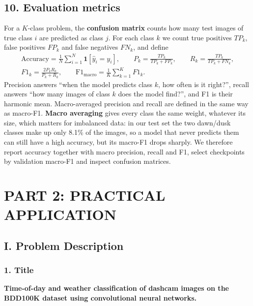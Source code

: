 \documentclass[12pt,letterpaper]{article}
\begin{document}
\subsection{10. Evaluation metrics}
For a $K$-class problem, the \textbf{confusion matrix} counts how many test images of true class $i$ are predicted as
class $j$. For each class $k$ we count true positives $TP_k$, false positives $FP_k$ and false negatives $FN_k$, and
define
\begin{equation}
  \begin{gathered}
  \mathrm{Accuracy}=\frac{1}{N}\sum_{i=1}^{N}\symbf 1[\hat y_i=y_i],\qquad
  P_k=\frac{TP_k}{TP_k+FP_k},\qquad R_k=\frac{TP_k}{TP_k+FN_k},\\
  F1_k=\frac{2P_kR_k}{P_k+R_k},\qquad \mathrm{F1}_{\mathrm{macro}}=\frac{1}{K}\sum_{k=1}^{K}F1_k .
  \end{gathered}
  \label{eq:prf}
\end{equation}
Precision answers ``when the model predicts class $k$, how often is it right?'', recall answers ``how many images of
class $k$ does the model find?'', and F1 is their harmonic mean. Macro-averaged precision and recall are defined in
the same way as macro-F1. \textbf{Macro averaging} gives every class the same weight, whatever its size, which matters
for imbalanced data: in our test set the two dawn/dusk classes make up only 8.1\% of the images, so a model that never
predicts them can still have a high accuracy, but its macro-F1 drops sharply. We therefore report accuracy together
with macro precision, recall and F1, select checkpoints by validation macro-F1 and inspect confusion matrices.

\FloatBarrier
\newpage
\section{PART 2: PRACTICAL APPLICATION}

\subsection{I. Problem Description}
\subsubsection{1. Title}
\textbf{Time-of-day and weather classification of dashcam images on the BDD100K dataset using convolutional neural
networks.}
\end{document}
